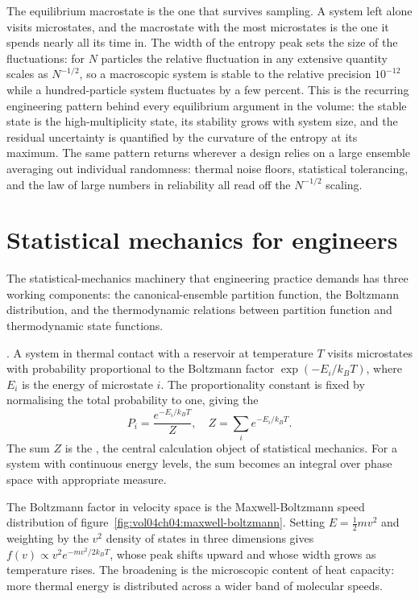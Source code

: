 

\begin{archetype}
The equilibrium macrostate is the one that survives sampling. A system
left alone visits microstates, and the macrostate with the most
microstates is the one it spends nearly all its time in. The width of
the entropy peak sets the size of the fluctuations: for $N$ particles
the relative fluctuation in any extensive quantity scales as
$N^{-1/2}$, so a macroscopic system is stable to the relative precision
$10^{-12}$ while a hundred-particle system fluctuates by a few percent.
This is the recurring engineering pattern behind every equilibrium
argument in the volume: the stable state is the high-multiplicity state,
its stability grows with system size, and the residual uncertainty is
quantified by the curvature of the entropy at its maximum. The same
pattern returns wherever a design relies on a large ensemble averaging
out individual randomness: thermal noise floors, statistical tolerancing,
and the law of large numbers in reliability all read off the
$N^{-1/2}$ scaling.
\end{archetype}

\section{Statistical mechanics for engineers}

The statistical-mechanics machinery that engineering practice
demands has three working components: the canonical-ensemble
partition function, the Boltzmann distribution, and the
thermodynamic relations between partition function and
thermodynamic state functions.

. A system in thermal contact with a
reservoir at temperature $T$ visits microstates with probability
proportional to the Boltzmann factor $\exp(-E_i/k_B T)$, where $E_i$
is the energy of microstate $i$. The proportionality constant is
fixed by normalising the total probability to one, giving the
\[
P_i = \frac{e^{-E_i/k_B T}}{Z}, \quad Z = \sum_i e^{-E_i/k_B T}.
\]
The sum $Z$ is the , the central
calculation object of statistical mechanics. For a system with
continuous energy levels, the sum becomes an integral over phase
space with appropriate measure.

The Boltzmann factor in velocity space is the Maxwell-Boltzmann speed
distribution of figure~\ref{fig:vol04ch04:maxwell-boltzmann}. Setting
$E = \tfrac12 m v^2$ and weighting by the $v^2$ density of states in
three dimensions gives $f(v) \propto v^2 e^{-mv^2/2k_B T}$, whose peak
shifts upward and whose width grows as temperature rises. The broadening
is the microscopic content of heat capacity: more thermal energy is
distributed across a wider band of molecular speeds.

